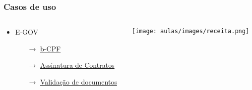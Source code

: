 \documentclass{beamer}
\begin{document}
\begin{frame}
\frametitle{Casos de uso}


\begin{columns}[T] %

    \begin{column}{0.7\textwidth} %
            \begin{itemize}
            \item E-GOV
            \begin{itemize}
                \item [$\rightarrow$] \href{https://repositorio.enap.gov.br/handle/1/4727}{b-CPF}
                \item [$\rightarrow$] \href{https://portal.tcu.gov.br/imprensa/noticias/tcu-e-bndes-lancam-rede-blockchain-brasil-e-definem-proximos-passos.htm}{Assinatura de Contratos}
                \item [$\rightarrow$] \href{https://einvestidor.estadao.com.br/criptomoedas/blockchain-governo-oficializa-uso-para-documentos/}{Validação de documentos}
            \end{itemize}
        \end{itemize}
    \end{column}
    \begin{column}{0.25\textwidth}
        \texttt{[image: aulas/images/receita.png]}
        \vspace{0.5cm} %
    \end{column}
\end{columns}



\end{frame}
\end{document}
